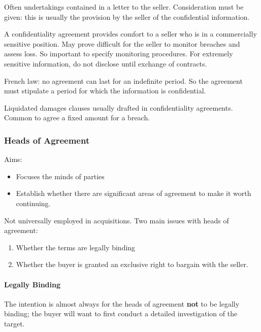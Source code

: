 \documentclass[
]{article}
\providecommand{\tightlist}{%
  \setlength{\itemsep}{0pt}\setlength{\parskip}{0pt}}
\begin{document}
Often undertakings contained in a letter to the seller. Consideration
must be given: this is usually the provision by the seller of the
confidential information.

A confidentiality agreement provides comfort to a seller who is in a
commercially sensitive position. May prove difficult for the seller to
monitor breaches and assess loss. So important to specify monitoring
procedures. For extremely sensitive information, do not disclose until
exchange of contracts.

French law: no agreement can last for an indefinite period. So the
agreement must stipulate a period for which the information is
confidential.

Liquidated damages clauses usually drafted in confidentiality
agreements. Common to agree a fixed amount for a breach.

\hypertarget{heads-of-agreement-1}{%
\subsubsection{Heads of Agreement}\label{heads-of-agreement-1}}

Aims:

\begin{itemize}
\tightlist
\item
  Focuses the minds of parties
\item
  Establish whether there are significant areas of agreement to make it
  worth continuing.
\end{itemize}

Not universally employed in acquisitions. Two main issues with heads of
agreement:

\begin{enumerate}
\def\labelenumi{\arabic{enumi}.}
\tightlist
\item
  Whether the terms are legally binding
\item
  Whether the buyer is granted an exclusive right to bargain with the
  seller.
\end{enumerate}

\hypertarget{legally-binding}{%
\paragraph{Legally Binding}\label{legally-binding}}

The intention is almost always for the heads of agreement \textbf{not}
to be legally binding; the buyer will want to first conduct a detailed
investigation of the target.
\end{document}
